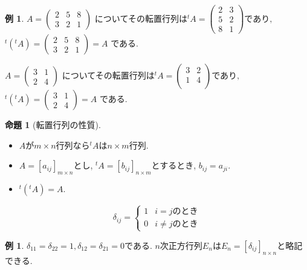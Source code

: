 \documentclass[dvipdfmx,a4paper,11pt]{article}
\theoremstyle{definition}
\newtheorem{prop}[thm]{命題}
\newtheorem{exa}[thm]{例}
\begin{document}
\begin{exa}
 $
 A = 
 \begin{pmatrix}
 2 &5&8 \\
 3&2&1
 \end{pmatrix}
 \text{ についてその転置行列は}
{}^{t}A = 
 \begin{pmatrix}
 2 &3 \\
 5&2\\
 8&1
 \end{pmatrix}
  \text{であり, }
 $
 $
{}^{t}({}^{t}A) = 
 \begin{pmatrix}
 2 &5&8 \\
 3&2&1
 \end{pmatrix}
 =A
 $
 である.
 
  $
 A = 
 \begin{pmatrix}
 3 &1 \\
 2&4
 \end{pmatrix}
 \text{ についてその転置行列は}
{}^{t}A = 
 \begin{pmatrix}
 3 &2 \\
 1&4\\
 \end{pmatrix}
  \text{であり, }
 $
  $
{}^{t}({}^{t}A) = 
 \begin{pmatrix}
 3 &1 \\
 2&4
 \end{pmatrix}
 =A
 $
 である.
\end{exa}

 \begin{tcolorbox}[
    colback = white,
    colframe = green!35!black,
    fonttitle = \bfseries,
    breakable = true]
    \begin{prop}[転置行列の性質]
    \text{}
\begin{itemize}
  \setlength{\parskip}{0cm} 
  \setlength{\itemsep}{0cm}
\item $A$が$m\times n$行列なら${}^{t}A $は$n\times m$行列.
\item $A=[a_{ij}]_{m \times n}$とし, ${}^{t}A=[b_{ij}]_{n \times m}$とするとき, $b_{ij} =a_{ji}$.
\item ${}^{t}({}^{t}A) =A$.
\end{itemize}

  \end{prop}
 \end{tcolorbox}
 
 
 $$
 \delta_{ij} = 
 \begin{cases}
1 & \text{$i=j$のとき}\\
0 & \text{$i \neq j$のとき}
\end{cases}
  $$
 \begin{exa}
 $\delta_{11}=\delta_{22}=1, \delta_{12}=\delta_{21}=0$である. $n$次正方行列$E_n$は$E_n = [\delta_{ij}]_{n\times n}$と略記できる.
 \end{exa}
\end{document}
